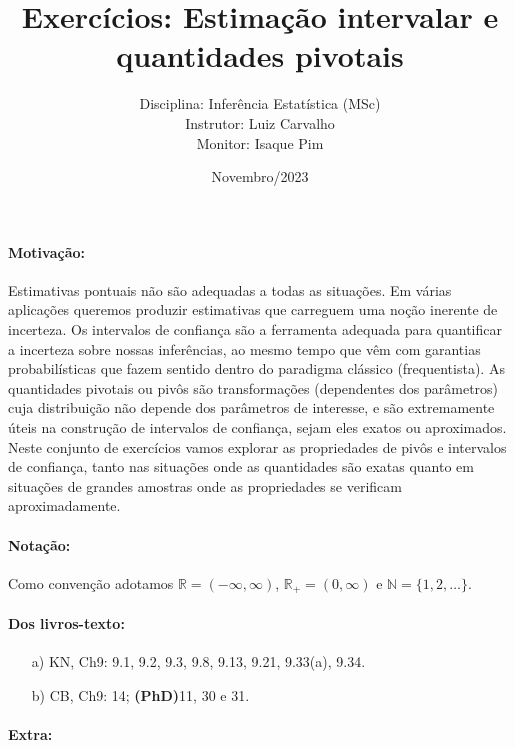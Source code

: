 \documentclass[a4paper,10pt, notitlepage]{report}
\title{Exercícios: Estimação intervalar e quantidades pivotais}
\author{Disciplina: Inferência Estatística (MSc) \\ Instrutor: Luiz Carvalho \\ Monitor: Isaque Pim}
\date{Novembro/2023}
\newcommand{\rpl}{\mathbb{R}_+}
\begin{document}
\maketitle

\paragraph{Motivação:} Estimativas pontuais não são adequadas a todas as situações.
Em várias aplicações queremos produzir estimativas que carreguem uma noção inerente de incerteza. 
Os intervalos de confiança são a ferramenta adequada para quantificar a incerteza sobre nossas inferências, ao mesmo tempo que vêm com garantias probabilísticas que fazem sentido dentro do paradigma clássico (frequentista).
As quantidades pivotais ou pivôs são transformações (dependentes dos parâmetros) cuja distribuição não depende dos parâmetros de interesse, e são extremamente úteis na construção de intervalos de confiança, sejam eles exatos ou aproximados.
Neste conjunto de exercícios vamos explorar as propriedades de pivôs e intervalos de confiança, tanto nas situações onde as quantidades são exatas quanto em situações de grandes amostras onde as propriedades se verificam aproximadamente.

\paragraph{Notação:} Como convenção adotamos $\mathbb{R} = (-\infty, \infty)$, $\rpl = (0, \infty)$ e $\mathbb{N} = \{1, 2, \ldots \}$.

\paragraph{Dos livros-texto:}

\begin{itemize}
    \item[a)] KN, Ch9:  9.1, 9.2, 9.3, 9.8, 9.13, 9.21, 9.33(a), 9.34.
    \item[b)] CB, Ch9: 14; \textbf{(PhD)}11, 30 e 31.
\end{itemize}

\paragraph{Extra:}
\end{document}
